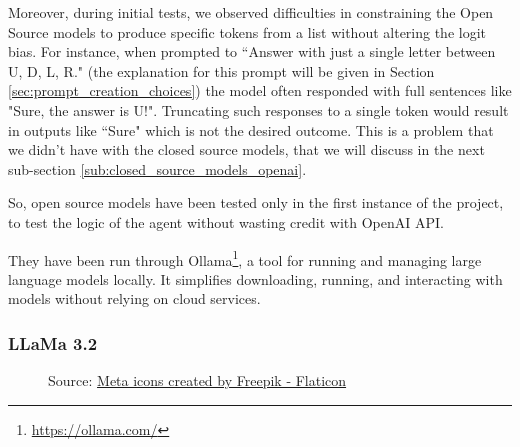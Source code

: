 Moreover, during initial tests, we observed difficulties in constraining the Open
Source models to produce specific tokens from a list without altering the logit bias.
For instance, when prompted to ``Answer with just a single letter between U, D, L,
R." (the explanation for this prompt will be given in Section \ref{sec:prompt_creation_choices})
the model often responded with full sentences like "Sure, the answer is U!". Truncating
such responses to a single token would result in outputs like ``Sure" which is
not the desired outcome. This is a problem that we didn't have with the closed source
models, that we will discuss in the next sub-section
\ref{sub:closed_source_models_openai}.

So, open source models have been tested only in the first instance of the project,
to test the logic of the agent without wasting credit with OpenAI API.

They have been run through Ollama\footnote{\url{https://ollama.com/}}, a tool
for running and managing large language models locally. It simplifies downloading,
running, and interacting with models without relying on cloud services.

\subsubsection{LLaMa 3.2}
\begin{figure}
  \centering
  \def\stackalignment{l}
  {\scriptsize \parbox[t]{\linewidth}{Source: \href{https://www.flaticon.com/free-icon/meta_6033716}{Meta icons created by Freepik - Flaticon}}}
\end{figure}

